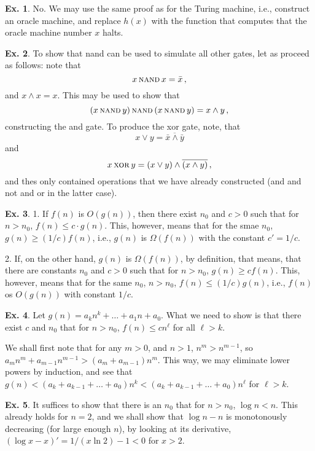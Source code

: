 \documentclass[a4paper,12pt]{article}
\theoremstyle{definition}
\newtheorem{exercise}{Ex.}[section]
\begin{document}
\begin{exercise}
 No. We may use the same proof as for the Turing machine, i.e., construct an oracle machine, and replace $h(x)$ with the function that computes that the oracle machine number $x$ halts.
\end{exercise}

\begin{exercise}
 To show that {\sc nand} can be used to simulate all other gates, let as proceed as follows: %
 note that
 \[
  x\text{\sc\,nand\,}x = \bar{x}\,,
 \]
 and $x \land x = x$. This may be used to show that
 \[
  (x\text{\sc\,nand\,}y)\text{\sc\,nand\,}(x\text{\sc\,nand\,}y)= x \land y\,,
 \]
 constructing the {\sc and} gate. To produce the {\sc xor} gate, note, that
 \[
 x \lor y = \overline{\bar x \land \bar y}
 \]
 and
 \[
  x \text{\sc\,xor\,} y = (x\lor y) \land \overline{(x\land y)}\,,
 \]
 and thes only contained operations that we have already constructed ({\sc and} and {\sc not} and {\sc or} in the latter case).
\end{exercise}

\begin{exercise}
 1. If $f(n)$ is $O(g(n))$, then there exist $n_0$ and $c>0$ such that for $n > n_0$, $f(n) \le c \cdot g(n)$. This, however, means that for the smae $n_0$, $g(n) \ge (1/c) f(n)$, i.e., $g(n)$ is $\Omega(f(n))$ with the constant $c'=1/c$.
 
 2. If, on the other hand, $g(n)$ is $\Omega(f(n))$, by definition, that means, that there are constants $n_0$ and $c>0$ such that for $n>n_0$, $g(n) \ge c f(n)$. This, however, means that for the same $n_0$, $n > n_0$, $f(n) \le (1/c) g(n)$, i.e., $f(n)$ os $O(g(n))$ with constant $1/c$.
\end{exercise}

\begin{exercise}
Let $g(n) = a_k n^k + \dots + a_1 n + a_0$. What we need to show is that there exist $c$ and $n_0$ that for $n>n_0$, $f(n) \le c n^\ell$ for all $\ell > k$. 

We shall first note that for any $m > 0$, and $n > 1$, $n^m > n^{m-1}$, so $a_m n^m + a_{m-1} n^{m-1} > (a_m + a_{m-1}) n^m$. This way, we may eliminate lower powers by induction, and see that $g(n) < (a_k + a_{k-1} + \dots + a_0) n^k < (a_k + a_{k-1} + \dots + a_0) n^\ell$ for $\ell > k$.
\end{exercise}

\begin{exercise}
 It suffices to show that there is an $n_0$ that for $n>n_0$, $\log n < n$. This already holds for $n=2$, and we shall show that $\log n - n$ is monotonously decreasing (for large enough $n$), by looking at its derivative, $(\log x - x)' = 1/(x\ln 2) -1 < 0$ for $x>2$.
\end{exercise}
\end{document}

